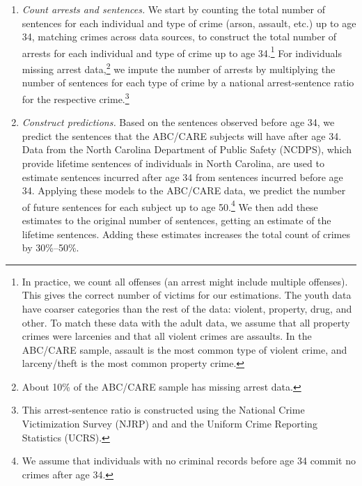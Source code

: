 \begin{enumerate}
\item \textit{Count arrests and sentences.} We start by counting the total number of sentences for each individual and type of crime (arson, assault, etc.) up to age 34, matching crimes across data sources, to construct the total number of  arrests for each individual and type of crime up to age 34.\footnote{In practice, we count all offenses (an arrest might include multiple offenses). This gives the correct number of victims for our estimations. The youth data have coarser categories than the rest of the data: violent, property, drug, and other. To match these data with the adult data, we assume that all property crimes were larcenies and that all violent crimes are assaults. In the ABC/CARE sample, assault is the most common type of violent crime, and larceny/theft is the most common property crime.} For individuals missing arrest data,\footnote{About 10\% of the ABC/CARE sample has missing arrest data.} we impute the number of arrests by multiplying the number of sentences for each type of crime by a national arrest-sentence ratio for the respective crime.\footnote{This arrest-sentence ratio is constructed using the National Crime Victimization Survey (NJRP) and and the Uniform Crime Reporting Statistics (UCRS).}

\item \textit{Construct predictions.} Based on the sentences observed before age 34, we predict the sentences that the ABC/CARE subjects will have after age 34. Data from the North Carolina Department of Public Safety (NCDPS), which provide lifetime sentences of individuals in North Carolina, are used to estimate sentences incurred after age 34 from sentences incurred before age 34. Applying these models to the ABC/CARE data, we predict the number of future sentences for each subject up to age 50.\footnote{We assume that individuals with no criminal records before age 34 commit no crimes after age 34.} We then add these estimates to the original number of sentences, getting an estimate of the lifetime sentences. Adding these estimates increases the total count of crimes by 30\%--50\%. 


\end{enumerate}

